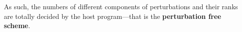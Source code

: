 As such, the numbers of different components of perturbations and their ranks
are totally decided by the host program---that is the
\textbf{perturbation free scheme}.

%
%
%
%


